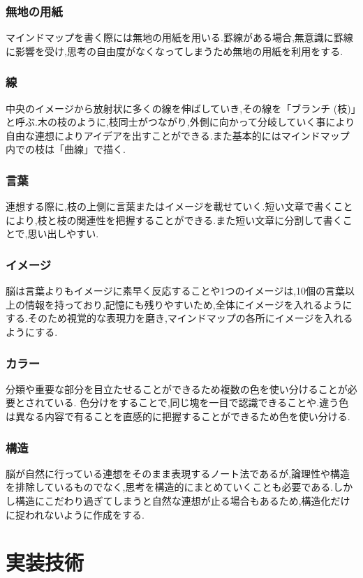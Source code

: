 \documentclass[a4j,12pt]{jarticle}
\begin{document}
\subsubsection{無地の用紙}
  マインドマップを書く際には無地の用紙を用いる.罫線がある場合,無意識に罫線に影響を受け,思考の自由度がなくなってしまうため無地の用紙を利用をする.
\subsubsection{線}
 中央のイメージから放射状に多くの線を伸ばしていき,その線を「ブランチ (枝)」と呼ぶ.木の枝のように,枝同士がつながり,外側に向かって分岐していく事により自由な連想によりアイデアを出すことができる.また基本的にはマインドマップ内での枝は「曲線」で描く.
\subsubsection{言葉}
連想する際に,枝の上側に言葉またはイメージを載せていく.短い文章で書くことにより,枝と枝の関連性を把握することができる.また短い文章に分割して書くことで,思い出しやすい.
\subsubsection{イメージ}
脳は言葉よりもイメージに素早く反応することや1つのイメージは,10個の言葉以上の情報を持っており,記憶にも残りやすいため,全体にイメージを入れるようにする.そのため視覚的な表現力を磨き,マインドマップの各所にイメージを入れるようにする.
\subsubsection{カラー}
 分類や重要な部分を目立たせることができるため複数の色を使い分けることが必要とされている.
 色分けをすることで,同じ塊を一目で認識できることや.違う色は異なる内容で有ることを直感的に把握することができるため色を使い分ける.
\subsubsection{構造}
脳が自然に行っている連想をそのまま表現するノート法であるが,論理性や構造を排除しているものでなく,思考を構造的にまとめていくことも必要である.しかし構造にこだわり過ぎてしまうと自然な連想が止る場合もあるため,構造化だけに捉われないように作成をする.



\newpage
\section{実装技術}
\end{document}
